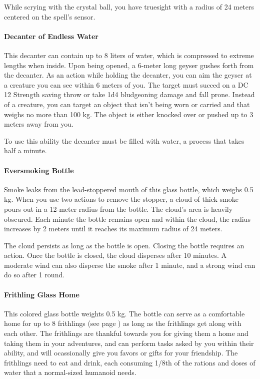         While scrying with the crystal ball, you have truesight with a radius of 24 meters centered on the spell's sensor.
    \paragraph{Decanter of Endless Water}
        This decanter can contain up to 8 liters of water, which is compressed to extreme lengths when inside.
        Upon being opened, a 6-meter long geyser gushes forth from the decanter.
        As an action while holding the decanter, you can aim the geyser at a creature you can see within 6 meters of you.
        The target must succed on a DC 12 Strength saving throw or take 1d4 bludgeoning damage and fall prone.
        Instead of a creature, you can target an object that isn't being worn or carried and that weighs no more than 100 kg.
        The object is either knocked over or pushed up to 3 meters away from you.

        To use this ability the decanter must be filled with water, a process that takes half a minute.
    \paragraph{Eversmoking Bottle}
        Smoke leaks from the lead-stoppered mouth of this glass bottle, which weighs 0.5 kg.
        When you use two actions to remove the stopper, a cloud of thick smoke pours out in a 12-meter radius from the bottle.
        The cloud's area is heavily obscured.
        Each minute the bottle remains open and within the cloud, the radius increases by 2 meters until it reaches its maximum radius of 24 meters.

        The cloud persists as long as the bottle is open.
        Closing the bottle requires an action.
        Once the bottle is closed, the cloud disperses after 10 minutes.
        A moderate wind can also disperse the smoke after 1 minute, and a strong wind can do so after 1 round.
    \paragraph{Frithling Glass Home} %
        This colored glass bottle weights 0.5 kg.
        The bottle can serve as a comfortable home for up to 8 frithlings (see page \pageref{creature::frithling}) as long as the frithlings get along with each other.
        The frithlings are thankful towards you for giving them a home and taking them in your adventures, and can perform tasks asked by you within their ability, and will ocassionally give you favors or gifts for your friendship.
        The frithlings need to eat and drink, each consuming 1/8th of the rations and doses of water that a normal-sized humanoid needs.

